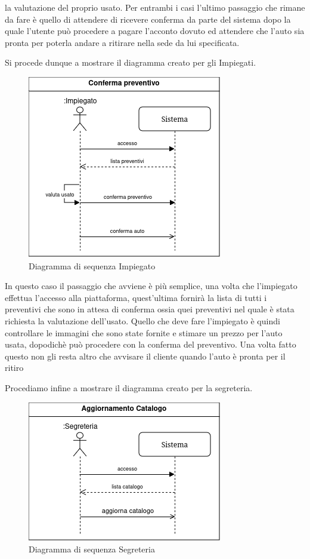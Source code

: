 \documentclass[a4paper, 11pt,oneside]{book}
\newcommand{\spacing}{\par\bigskip\noindent}
\begin{document}
        la valutazione del proprio usato. Per entrambi i casi l'ultimo passaggio che rimane da fare è quello di attendere di ricevere conferma da parte del sistema dopo la quale l'utente può procedere a pagare
        l'acconto dovuto ed attendere che l'auto sia pronta per poterla andare a ritirare nella sede da lui specificata.
        \spacing
        Si procede dunque a mostrare il diagramma creato per gli Impiegati.
        \begin{figure}[H]
            \centering
            \includegraphics[scale=0.75]{sequence_diagram_confirm.png}
            \caption{Diagramma di sequenza Impiegato}
            \label{fig:diagramma_sequenza_impiegato}
        \end{figure}
        \spacing
        In questo caso il passaggio che avviene è più semplice, una volta che l'impiegato effettua l'accesso alla piattaforma, quest'ultima fornirà la lista di tutti
        i preventivi che sono in attesa di conferma ossia quei preventivi nel quale è stata richiesta la valutazione dell'usato. Quello che deve fare l'impiegato è quindi controllare le immagini che sono state fornite
        e stimare un prezzo per l'auto usata, dopodichè può procedere con la conferma del preventivo. Una volta fatto questo non gli resta altro che avvisare il cliente quando l'auto è pronta per il ritiro
        \spacing
        Procediamo infine a mostrare il diagramma creato per la segreteria.
        \begin{figure}[H]
            \centering
            \includegraphics[scale=0.75]{sequence_diagram_catalog.png}
            \caption{Diagramma di sequenza Segreteria}
            \label{fig:diagramma_sequenza_segreteria}
        \end{figure}
\end{document}

